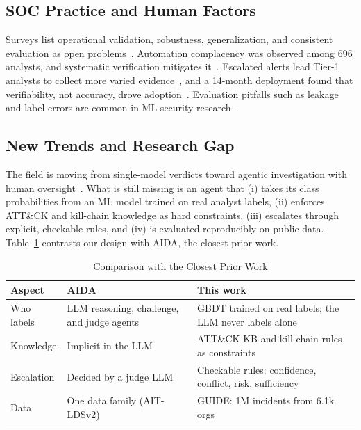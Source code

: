 \documentclass[conference]{IEEEtran}
\begin{document}
\subsection{SOC Practice and Human Factors}
Surveys list operational validation, robustness, generalization, and
consistent evaluation as open problems~\cite{ndichu2026,habibzadeh2025}.
Automation complacency was observed among 696 analysts, and systematic
verification mitigates it~\cite{tilbury2026}. Escalated alerts lead
Tier-1 analysts to collect more varied evidence~\cite{kersten2025}, and
a 14-month deployment found that verifiability, not accuracy, drove
adoption~\cite{banstola2026}. Evaluation pitfalls such as leakage and
label errors are common in ML security
research~\cite{arp2022,engelen2021}.

\subsection{New Trends and Research Gap}
The field is moving from single-model verdicts toward agentic
investigation with human oversight~\cite{tsegai2026,banstola2026}.
What is still missing is an agent that (i) takes its class
probabilities from an ML model trained on real analyst labels,
(ii) enforces ATT\&CK and kill-chain knowledge as hard constraints,
(iii) escalates through explicit, checkable rules, and (iv) is
evaluated reproducibly on public data. Table~\ref{tab:compare} contrasts
our design with AIDA, the closest prior work.

\begin{table}[t]
\caption{Comparison with the Closest Prior Work}
\label{tab:compare}
\centering
\footnotesize
\setlength{\tabcolsep}{3pt}
\begin{tabular}{@{}p{1.5cm}p{3.0cm}p{3.3cm}@{}}
\toprule
\textbf{Aspect} & \textbf{AIDA~\cite{tsegai2026}} & \textbf{This work} \\
\midrule
Who labels & LLM reasoning, challenge, and judge agents
& GBDT trained on real labels; the LLM never labels alone \\
Knowledge & Implicit in the LLM
& ATT\&CK KB and kill-chain rules as constraints \\
Escalation & Decided by a judge LLM
& Checkable rules: confidence, conflict, risk, sufficiency \\
Data & One data family (AIT-LDSv2)
& GUIDE: 1M incidents from 6.1k orgs \\
\bottomrule
\end{tabular}
\end{table}
\end{document}

